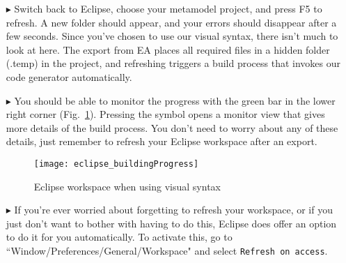 \begin{itemize}
\item[$\blacktriangleright$] Switch back to Eclipse, choose your metamodel project, and press F5 to refresh. A new folder should appear, and your errors should
disappear after a few seconds. Since you've chosen to use our visual syntax, there isn't much to look at here. The export from EA places all required files in a
hidden folder (.temp) in the project, and refreshing triggers a build process that invokes our code generator automatically. 

\item[$\blacktriangleright$] You should be able to monitor the progress with the green bar in the lower right corner (Fig.~\ref{eclipse:build}). Pressing the
symbol opens a monitor view that gives more details of the build process. You don't need to worry about any of these details, just remember to refresh your
Eclipse workspace after an export.


\vspace{0.5cm}

\begin{figure}[htbp]
	\centering
  \texttt{[image: eclipse\_buildingProgress]}
	\caption{Eclipse workspace when using visual syntax} 
	\label{eclipse:build} 
\end{figure}

\vspace{0.5cm}

\item[$\blacktriangleright$] If you're ever worried about forgetting to refresh your workspace, or if you just don't want to bother with having to do this,
Eclipse does offer an option to do it for you automatically. To activate this, go to ``Window/Preferences/General/Workspace" and select \texttt{Refresh on
access}.

\end{itemize}